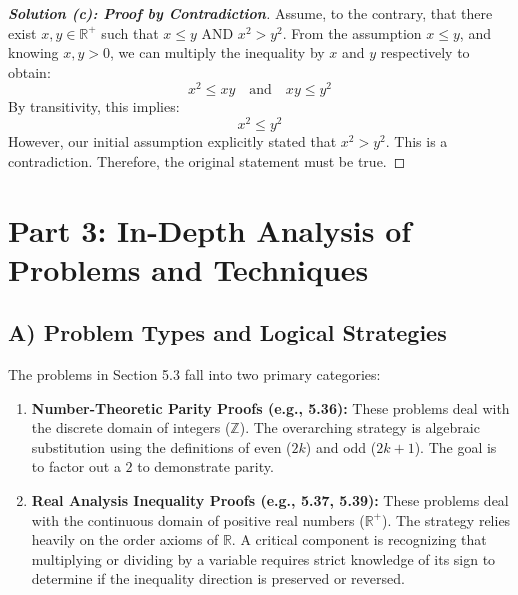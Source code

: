 \documentclass[11pt, a4paper]{article}
\theoremstyle{definition}
\theoremstyle{remark}
\newcommand{\R}{\mathbb{R}}
\newcommand{\Z}{\mathbb{Z}}
\begin{document}
\begin{proof}[\textbf{Solution (c): Proof by Contradiction}]
Assume, to the contrary, that there exist $x, y \in \R^+$ such that $x \leq y$ AND $x^2 > y^2$.
From the assumption $x \leq y$, and knowing $x, y > 0$, we can multiply the inequality by $x$ and $y$ respectively to obtain:
\[ x^2 \leq xy \quad \text{and} \quad xy \leq y^2 \]
By transitivity, this implies:
\[ x^2 \leq y^2 \]
However, our initial assumption explicitly stated that $x^2 > y^2$. This is a contradiction. Therefore, the original statement must be true.
\end{proof}

\section{Part 3: In-Depth Analysis of Problems and Techniques}

\subsection{A) Problem Types and Logical Strategies}
The problems in Section 5.3 fall into two primary categories:
\begin{enumerate}
    \item \textbf{Number-Theoretic Parity Proofs (e.g., 5.36):} These problems deal with the discrete domain of integers ($\Z$). The overarching strategy is algebraic substitution using the definitions of even ($2k$) and odd ($2k+1$). The goal is to factor out a $2$ to demonstrate parity.
    \item \textbf{Real Analysis Inequality Proofs (e.g., 5.37, 5.39):} These problems deal with the continuous domain of positive real numbers ($\R^+$). The strategy relies heavily on the order axioms of $\R$. A critical component is recognizing that multiplying or dividing by a variable requires strict knowledge of its sign to determine if the inequality direction is preserved or reversed.
\end{enumerate}
\end{document}
